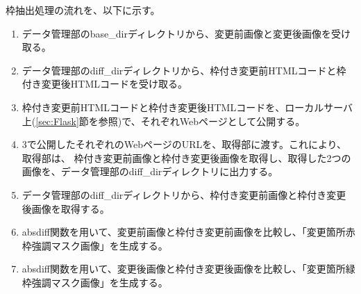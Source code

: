 \par
枠抽出処理の流れを、以下に示す。
\begin{enumerate}
    \item データ管理部のbase\_dirディレクトリから、変更前画像と変更後画像を受け取る。
    \item データ管理部のdiff\_dirディレクトリから、枠付き変更前HTMLコードと枠付き変更後HTMLコードを受け取る。
    \item 枠付き変更前HTMLコードと枠付き変更後HTMLコードを、ローカルサーバ上(\ref{sec:Flask}節を参照)で、それぞれWebページとして公開する。
    \item 3で公開したそれぞれのWebページのURLを、取得部に渡す。これにより、取得部は、
          枠付き変更前画像と枠付き変更後画像を取得し、取得した2つの画像を、データ管理部のdiff\_dirディレクトリに出力する。
    \item データ管理部のdiff\_dirディレクトリから、枠付き変更前画像と枠付き変更後画像を取得する。
    \item absdiff関数を用いて、変更前画像と枠付き変更前画像を比較し、「変更箇所赤枠強調マスク画像」を生成する。
    \item absdiff関数を用いて、変更後画像と枠付き変更後画像を比較し、「変更箇所緑枠強調マスク画像」を生成する。
\end{enumerate}

